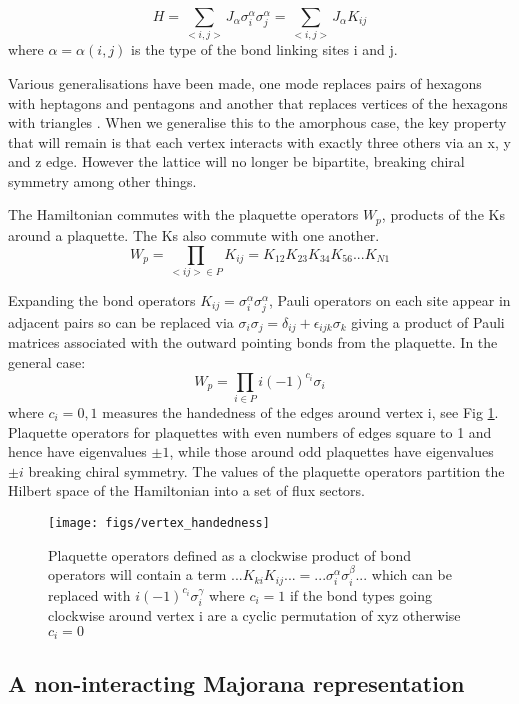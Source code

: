 \[H = \sum_{<i,j>} J_\alpha \sigma_i^{\alpha} \sigma_j^{\alpha} = \sum_{<i,j>} J_\alpha K_{ij}\]
where \(\alpha = \alpha(i,j)\) is the type of the bond linking sites i and j.

Various generalisations have been made, one mode replaces pairs of hexagons with heptagons and pentagons \cite{periNonAbelianChiralSpin2020} and another that replaces vertices of the hexagons with triangles \cite{yaoExactChiralSpin2007}. When we generalise this to the amorphous case, the key property that will remain is that each vertex interacts with exactly three others via an x, y and z edge. However the lattice will no longer be bipartite, breaking chiral symmetry among other things. 

The Hamiltonian commutes with the plaquette operators \(W_p\), products of the Ks around a plaquette. The Ks also commute with one another.
\[W_p = \prod_{<ij> \in P} K_{ij} = K_{12}K_{23}K_{34}K_{56} ... K_{N1}\]

Expanding the bond operators \(K_{ij} = \sigma_i^{\alpha} \sigma_j^{\alpha}\), Pauli operators on each site appear in adjacent pairs so can be replaced via \(\sigma_i \sigma_j = \delta_{ij} + \epsilon_{ijk} \sigma_k\) giving a product of Pauli matrices associated with the outward pointing bonds from the plaquette. In the general case:
\[W_p = \prod_{i \in P} i (-1)^{c_i} \sigma_i\]
where \(c_i = 0,1\) measures the handedness of the edges around vertex i, see Fig \ref{fig:handedness}. Plaquette operators for plaquettes with even numbers of edges square to 1 and hence have eigenvalues \(\pm 1\), while those around odd plaquettes have eigenvalues \(\pm i\) breaking chiral symmetry. The values of the plaquette operators partition the Hilbert space of the Hamiltonian into a set of flux sectors.


\begin{figure}
    \centering
    \texttt{[image: figs/vertex\_handedness]}
    \caption{Plaquette operators defined as a clockwise product of bond operators will contain a term \(...K_{ki}K_{ij}... = ...\sigma^\alpha_i \sigma^\beta_i ...\) which can be replaced with \(i (-1)^{c_i} \sigma_i^\gamma\) where \(c_i = 1\) if the bond types going clockwise around vertex i are a cyclic permutation of xyz otherwise \(c_i = 0\)}
    \label{fig:handedness}
\end{figure}

\subsection{A non-interacting Majorana representation}

